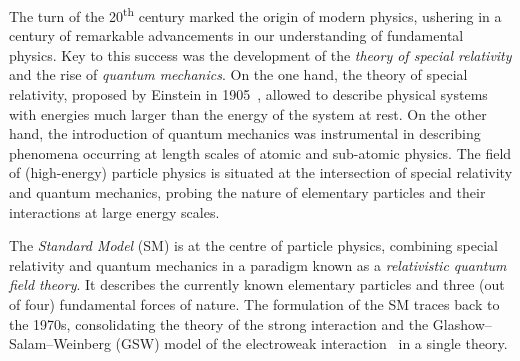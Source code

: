 %
%
%
%
%






The turn of the 20\textsuperscript{th} century marked the origin of modern
physics, ushering in a century of remarkable advancements in our understanding
of fundamental physics. Key to this success was the development of the
\emph{theory of special relativity} and the rise of \emph{quantum mechanics}. On
the one hand, the theory of special relativity, proposed by Einstein in
1905~\cite{einstein:1905zedbk,einstein:1905idtekvsea}, allowed to describe
physical systems with energies much larger than the energy of the system at
rest. On the other hand, the introduction of quantum mechanics was instrumental
in describing phenomena occurring at length scales of atomic and sub-atomic
physics. The field of (high-energy) particle physics is situated at the
intersection of special relativity and quantum mechanics, probing the nature of
elementary particles and their interactions at large energy scales.

The \emph{Standard Model} (SM) is at the centre of particle physics, combining
special relativity and quantum mechanics in a paradigm known as a
\emph{relativistic quantum field theory}. It describes the currently known
elementary particles and three (out of four) fundamental forces of nature.  The
formulation of the SM traces back to the 1970s, consolidating the theory of the
strong interaction and the Glashow--Salam--Weinberg (GSW) model
of the electroweak
interaction~\cite{Glashow:1961tr,Salam:1964ry,Weinberg:1967tq} in a single
theory.

